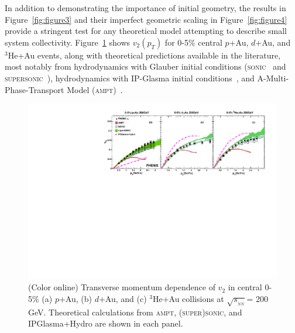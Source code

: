 \documentclass[%
reprint,
showpacs,preprintnumbers,
 amsmath,amssymb,
 aps,
]{revtex4-1}
\newcommand{\pt}{\mbox{$p_T$}\xspace}
\newcommand{\sqsn}{\mbox{$\sqrt{s_{_{NN}}}$}\xspace}
\newcommand{\dau}{\mbox{$d$+Au}\xspace}
\newcommand{\pau}{\mbox{$p$+Au}\xspace}
\newcommand{\hau}{\mbox{$^3\text{He}$+Au}\xspace}
\begin{document}
In addition to demonstrating the importance of initial geometry, the results in Figure~\ref{fig:figure3} and their imperfect geometric scaling in Figure~\ref{fig:figure4} provide a stringent test for any theoretical model attempting to describe small system collectivity. Figure~\ref{fig:figure5} shows $v_2(\pt)$ for 0-5\% central \pau, \dau, and \hau events, along with theoretical predictions available in the literature, most notably from hydrodynamics with Glauber initial conditions (\textsc{sonic}~\cite{Habich:2014jna} and \textsc{supersonic}~\cite{Romatschke:2015gxa}), hydrodynamics with IP-Glasma initial conditions~\cite{Schenke:2014gaa}, and A-Multi-Phase-Transport Model (\textsc{ampt})~\cite{lin_multiphase_2005}.

\begin{figure}[htbp]
  \includegraphics[scale=0.9]{Figures/figure5.pdf}
  \caption{(Color online) Transverse momentum dependence of $v_2$ in central 0-5\% (a) \pau, (b) \dau, and (c) \hau collisions at \sqsn = 200 GeV. Theoretical calculations from \textsc{ampt}, \textsc{(super)sonic}, and IPGlasma+Hydro are shown in each panel.}
\label{fig:figure5}
\end{figure}
\end{document}
